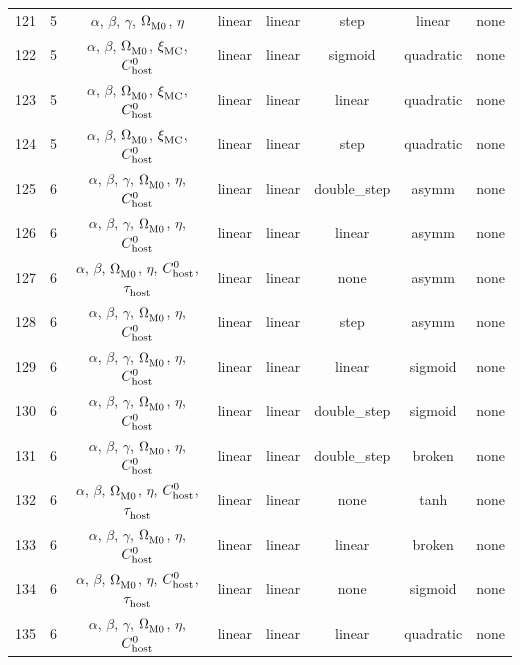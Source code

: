 \begin{longtable}{c c c c c c c c}
    121 & 5 & $\alpha$, $\beta$, $\gamma$, $\Omega_{\rm M0}^{}$, $\eta$ & linear & linear & step & linear & none \\
    122 & 5 & $\alpha$, $\beta$, $\Omega_{\rm M0}^{}$, $\xi_{\rm MC}^{}$, $C_{\rm host}^{0}$ & linear & linear & sigmoid & quadratic & none \\
    123 & 5 & $\alpha$, $\beta$, $\Omega_{\rm M0}^{}$, $\xi_{\rm MC}^{}$, $C_{\rm host}^{0}$ & linear & linear & linear & quadratic & none \\
    124 & 5 & $\alpha$, $\beta$, $\Omega_{\rm M0}^{}$, $\xi_{\rm MC}^{}$, $C_{\rm host}^{0}$ & linear & linear & step & quadratic & none \\
    125 & 6 & $\alpha$, $\beta$, $\gamma$, $\Omega_{\rm M0}^{}$, $\eta$, $C_{\rm host}^{0}$ & linear & linear & double\_step & asymm & none \\
    126 & 6 & $\alpha$, $\beta$, $\gamma$, $\Omega_{\rm M0}^{}$, $\eta$, $C_{\rm host}^{0}$ & linear & linear & linear & asymm & none \\
    127 & 6 & $\alpha$, $\beta$, $\Omega_{\rm M0}^{}$, $\eta$, $C_{\rm host}^{0}$, $\tau_{\rm host}^{}$ & linear & linear & none & asymm & none \\
    128 & 6 & $\alpha$, $\beta$, $\gamma$, $\Omega_{\rm M0}^{}$, $\eta$, $C_{\rm host}^{0}$ & linear & linear & step & asymm & none \\
    129 & 6 & $\alpha$, $\beta$, $\gamma$, $\Omega_{\rm M0}^{}$, $\eta$, $C_{\rm host}^{0}$ & linear & linear & linear & sigmoid & none \\
    130 & 6 & $\alpha$, $\beta$, $\gamma$, $\Omega_{\rm M0}^{}$, $\eta$, $C_{\rm host}^{0}$ & linear & linear & double\_step & sigmoid & none \\
    131 & 6 & $\alpha$, $\beta$, $\gamma$, $\Omega_{\rm M0}^{}$, $\eta$, $C_{\rm host}^{0}$ & linear & linear & double\_step & broken & none \\
    132 & 6 & $\alpha$, $\beta$, $\Omega_{\rm M0}^{}$, $\eta$, $C_{\rm host}^{0}$, $\tau_{\rm host}^{}$ & linear & linear & none & tanh & none \\
    133 & 6 & $\alpha$, $\beta$, $\gamma$, $\Omega_{\rm M0}^{}$, $\eta$, $C_{\rm host}^{0}$ & linear & linear & linear & broken & none \\
    134 & 6 & $\alpha$, $\beta$, $\Omega_{\rm M0}^{}$, $\eta$, $C_{\rm host}^{0}$, $\tau_{\rm host}^{}$ & linear & linear & none & sigmoid & none \\
    135 & 6 & $\alpha$, $\beta$, $\gamma$, $\Omega_{\rm M0}^{}$, $\eta$, $C_{\rm host}^{0}$ & linear & linear & linear & quadratic & none \\

\end{longtable}

